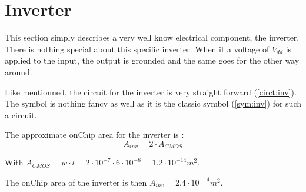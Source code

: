 \section{Inverter}
\label{sec:inv}

This section simply describes a very well know electrical component, the inverter. There is nothing special about this specific inverter. When it a voltage of $V_{dd}$ is applied to the input, the output is grounded and the same goes for the other way around.

\begin{figure}[H]
  \centering
  \hspace*{2.5cm}
  \hfill
  \hspace*{1.5cm}
  \caption{}
  \label{fig:inv}
\end{figure}

Like mentionned, the circuit for the inverter is very straight forward (\cref{circt:inv}). The symbol is nothing fancy as well as it is the classic symbol (\cref{sym:inv}) for such a circuit.

The approximate onChip area for the inverter is :
\begin{equation}
  A_{inv}=2\cdot A_{CMOS}
\end{equation}

With $A_{CMOS}= w\cdot l=2\cdot 10^{-7}\cdot6\cdot10^{-8} =1.2\cdot10^{-14}m^2$.

The onChip area of the inverter is then $A_{inv}=2.4\cdot10^{-14}m^2$.
